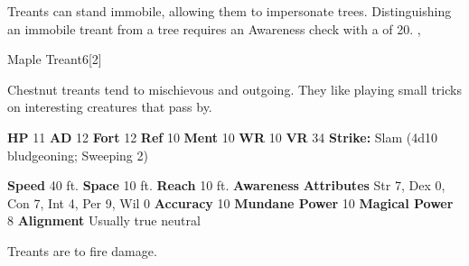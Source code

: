         Treants can stand immobile, allowing them to impersonate trees.
        Distinguishing an immobile treant from a tree requires an Awareness check with a  of 20.
  ,
  \begin{monsubsection}{Maple Treant}{6}[2]
    \vspace{-1em}\vspace{-1em}
    \vspace{0em}

    
        Chestnut treants tend to mischievous and outgoing.
        They like playing small tricks on interesting creatures that pass by.
      
    

    \begin{spellcontent}
      \begin{spelltargetinginfo}
        \pari \textbf{HP} 11 \monsep
          \textbf{AD} 12 \monsep
          \textbf{Fort} 12 \monsep
          \textbf{Ref} 10 \monsep
          \textbf{Ment} 10
        \pari \textbf{WR} 10 \monsep
        \textbf{VR} 34
        \pari \textbf{Strike:}
            Slam  (4d10 bludgeoning; Sweeping 2)
      \end{spelltargetinginfo}
    \end{spellcontent}
    \begin{monsterfooter}
      \pari \textbf{Speed} 40 ft. \monsep
        \textbf{Space} 10 ft. \monsep
        \textbf{Reach} 10 ft.
      \pari \textbf{Awareness} 
      \pari \textbf{Attributes}
        Str 7, Dex 0,
        Con 7, Int 4,
        Per 9, Wil 0
      \pari \textbf{Accuracy} 10 \monsep
        \textbf{Mundane Power} 10 \monsep
      \textbf{Magical Power} 8
      \pari \textbf{Alignment} Usually true neutral
    \end{monsterfooter}
  \end{monsubsection}
        Treants are  to fire damage.
      
